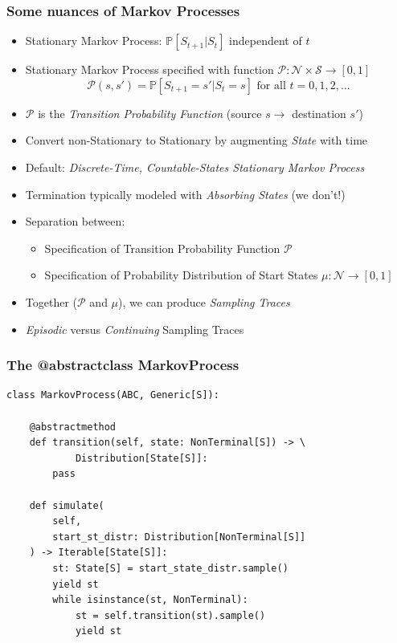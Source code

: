 \documentclass[handout]{beamer}
\begin{document}
\begin{frame}
\frametitle{Some nuances of Markov Processes}
\pause
\begin{itemize}[<+->]
\item Stationary Markov Process: $\mathbb{P}[S_{t+1}|S_t]$ independent of $t$
\item Stationary Markov Process specified with function $\mathcal{P}: \mathcal{N} \times \mathcal{S} \rightarrow [0,1]$
$$\mathcal{P}(s, s') = \mathbb{P}[S_{t+1}=s'|S_t=s] \text{ for all } t = 0, 1, 2, \ldots$$
\item $\mathcal{P}$ is the {\em Transition Probability Function} (source $s \rightarrow$ destination $s'$)
\item Convert non-Stationary to Stationary by augmenting {\em State} with time
\item Default: {\em Discrete-Time, Countable-States Stationary Markov Process}
\item Termination typically modeled with {\em Absorbing States} (we don't!)
\item Separation between:
\begin{itemize}
\item Specification of Transition Probability Function $\mathcal{P}$
\item Specification of Probability Distribution of Start States $\mu: \mathcal{N} \rightarrow [0, 1]$ 
\end{itemize}
\item Together ($\mathcal{P}$ and $\mu$), we can produce {\em Sampling Traces}
\item {\em Episodic} versus {\em Continuing} Sampling Traces
\end{itemize}
\end{frame}

\begin{frame}[fragile]
\frametitle{The @abstractclass MarkovProcess}
\pause
\begin{lstlisting}
class MarkovProcess(ABC, Generic[S]):

    @abstractmethod
    def transition(self, state: NonTerminal[S]) -> \
            Distribution[State[S]]:
        pass

    def simulate(
        self,
        start_st_distr: Distribution[NonTerminal[S]]
    ) -> Iterable[State[S]]:
        st: State[S] = start_state_distr.sample()
        yield st
        while isinstance(st, NonTerminal):
            st = self.transition(st).sample()
            yield st
\end{lstlisting}
\end{frame}
\end{document}
